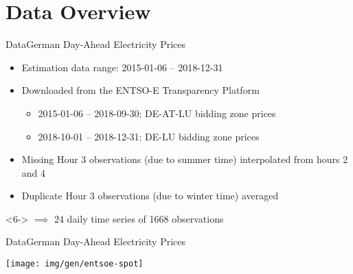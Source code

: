\section{Data Overview}
\label{sec:data}

\begin{frame}{Data}{German Day-Ahead Electricity Prices}
  \begin{itemize}
  \item<2-> Estimation data range: 2015-01-06 -- 2018-12-31
  \item<3-> Downloaded from the ENTSO-E Transparency Platform
    \begin{itemize}
    \item 2015-01-06 -- 2018-09-30: DE-AT-LU bidding zone prices
    \item 2018-10-01 -- 2018-12-31: DE-LU bidding zone prices
    \end{itemize}
  \item<4-> Missing Hour 3 observations (due to summer time) interpolated from hours 2 and 4
  \item<5-> Duplicate Hour 3 observations (due to winter time) averaged
  \end{itemize}

  \begin{block}{}<6->
    \(\implies\) 24 daily time series of 1668 observations
  \end{block}
\end{frame}

\begin{frame}{Data}{German Day-Ahead Electricity Prices}
  \begin{center}
    \texttt{[image: img/gen/entsoe-spot]}
  \end{center}
\end{frame}

